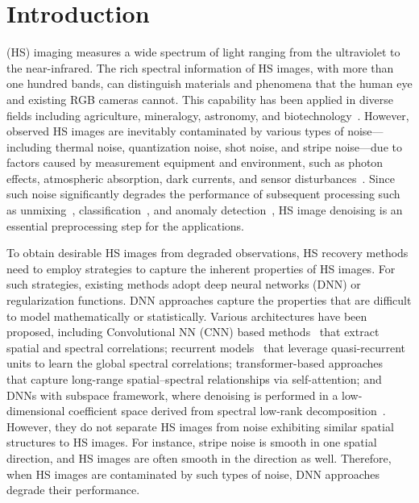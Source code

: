 \section{Introduction}
 (HS) imaging measures a wide spectrum of light ranging from the ultraviolet to the near-infrared.
The rich spectral information of HS images, with more than one hundred bands, can distinguish materials and phenomena that the human eye and existing RGB cameras cannot.
This capability has been applied in diverse fields including agriculture, mineralogy, astronomy, and biotechnology~\cite{Borengasser2007HSIApplications,Grahn2007Techniques, Thenkabail2016VegetationOverview,Lu2020AgricultureOverview}.
However, observed HS images are inevitably contaminated by various types of noise---including thermal noise, quantization noise, shot noise, and stripe noise---due to factors caused by measurement equipment and environment, such as photon effects, atmospheric absorption, dark currents, and sensor disturbances~\cite{Shen2015DenoisingOverview,Rasti2018DenoisingOverview,Shen2022DenoisingOverview}.
Since such noise significantly degrades the performance of subsequent processing such as unmixing~\cite{Bioucas-Dias2012UnmixingOverview,Ma2014UnmixingOverview}, classification~\cite{Ghamisi2017Classification,Li2019Classification,Nicolas2019Classification}, and anomaly detection~\cite{Matteoli2014Anomaly,Su2022Anomaly}, HS image denoising is an essential preprocessing step for the applications.


To obtain desirable HS images from degraded observations, HS recovery methods need to employ strategies to capture the inherent properties of HS images. For such strategies, existing methods adopt deep neural networks (DNN) or regularization functions. DNN approaches capture the properties that are difficult to model mathematically or statistically. Various architectures have been proposed, including Convolutional NN (CNN) based methods~\cite{Yuan2019HSIDCNN, Wang2022NL3DCNN} that extract spatial and spectral correlations; recurrent models~\cite{Wei2021QRNN3D} that leverage quasi-recurrent units to learn the global spectral correlations; transformer-based approaches~\cite{Li2023SST} that capture long-range spatial–spectral relationships via self-attention; and DNNs with subspace framework, where denoising is performed in a low-dimensional coefficient space derived from spectral low-rank decomposition~\cite{Zhuang2023FastHyMix, Peng2024RCILD}. However, they do not separate HS images from noise exhibiting similar spatial structures to HS images. For instance, stripe noise is smooth in one spatial direction, and HS images are often smooth in the direction as well. Therefore, when HS images are contaminated by such types of noise, DNN approaches degrade their performance.


